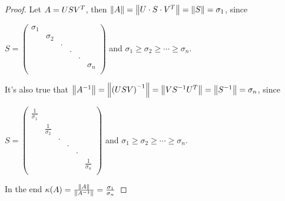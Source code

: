 \documentclass[computationalMathematics.tex]{subfiles}
\begin{document}
\begin{proof}
Let $A = US{V}^{T}$, then $\left\lVert A\right\rVert = \left\lVert U \cdot S \cdot {V}^{T}\right\rVert = \left\lVert S\right\rVert = \sigma_1$, since 

$S =  \begin{pmatrix}
    \sigma_1 &&&&&\\
    & \sigma_2&&&&\\
    && \cdot&&&\\
    &&& \cdot&&\\
    &&&& \cdot&\\
    &&&&& \sigma_n\\
  \end{pmatrix}$ and $\sigma_1 \ge \sigma_2 \ge \cdots \ge \sigma_n$. 

  It's also true that $\left\lVert{A}^{-1}\right\rVert = \left\lVert{(USV)}^{-1}\right\rVert = \left\lVert V{S}^{-1} {U}^{T}\right\rVert = \left\lVert{S}^{-1}\right\rVert = \sigma_n$, since 

$S =  \begin{pmatrix}
  \frac{1}{\sigma_1} &&&&&\\
    & \frac{1}{\sigma_2}&&&&\\
    && \cdot&&&\\
    &&& \cdot&&\\
    &&&& \cdot&\\
    &&&&& \frac{1}{\sigma_n}\\
  \end{pmatrix}$ and $\sigma_1 \ge \sigma_2 \ge \cdots \ge \sigma_n$. 

In the end $\kappa(A) = \frac{\left\lVert A\right\rVert}{\left\lVert{A}^{-1}\right\rVert} = \frac{\sigma_1}{\sigma_n}$
\end{proof}
\end{document}
